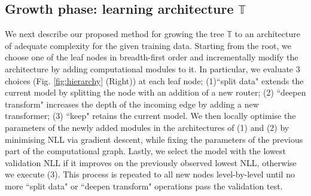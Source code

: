 
\subsection{Growth phase: learning architecture \texorpdfstring{$\mathbb{T}$}{T}}
We next describe our proposed method for growing the tree $\mathbb{T}$ to an architecture of adequate complexity for the given training data. Starting from the root, we choose one of the leaf nodes in breadth-first order and incrementally modify the architecture by adding computational modules to it. In particular, we evaluate $3$ choices (Fig. \ref{fig:hierarchy} (Right)) at each leaf node; (1)``split data" extends the current model by splitting the node with an addition of a new router; (2) ``deepen transform" increases the depth of the incoming edge by adding a new transformer; (3) ``keep" retains the current model. We then locally optimise the parameters of the newly added modules in the architectures of (1) and (2) by minimising NLL via gradient descent, while fixing the parameters of the previous part of the computational graph. Lastly, we select the model with the lowest validation NLL if it improves on the previously observed lowest NLL, otherwise we execute (3). This process is repeated to all new nodes level-by-level until no more ``split data" or ``deepen transform" operations pass the validation test. 

